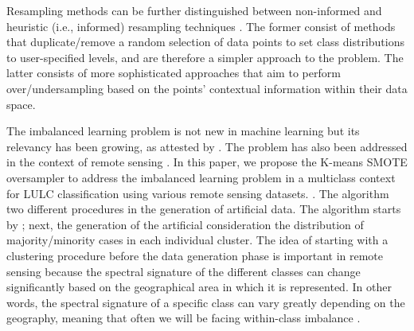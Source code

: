 \documentclass[remotesensing,article,submit,moreauthors,pdftex]{Definitions/mdpi}
\begin{document}
Resampling methods can be further distinguished between non-informed and
heuristic (i.e., informed) resampling techniques
\cite{Fernandez2013,Luengo2020,Garcia2016}. The former consist of methods that
duplicate/remove a random selection of data points to set class distributions
to user-specified levels, and are therefore a simpler approach to the problem.
The latter consists of more sophisticated approaches that aim to perform
over/undersampling based on the points' contextual information within their
data space.

The imbalanced learning problem is not new in machine learning but its
relevancy has been growing, as attested by \cite{Haixiang2017}. The problem
has also been addressed in the context of remote sensing \cite{Douzas2019rs}.
In this paper, we propose  the K-means SMOTE 
\cite{Douzas2018} oversampler\added{,} to address the imbalanced learning
problem in a multiclass context for LULC classification using various remote
sensing datasets. .
The  algorithm  two different
procedures in the generation of artificial data. The algorithm starts by
; next, the generation of the artificial
 consideration the distribution of
majority/minority cases in each individual cluster. The idea of starting with
a clustering procedure before the data generation phase is important in remote
sensing because the spectral signature of the different classes can change
significantly based on the geographical area in which it is represented. In
other words, the spectral signature of a specific class can vary greatly
depending on the geography, meaning that often we will be facing within-class
imbalance \cite{Japkowicz2001}.
\end{document}
